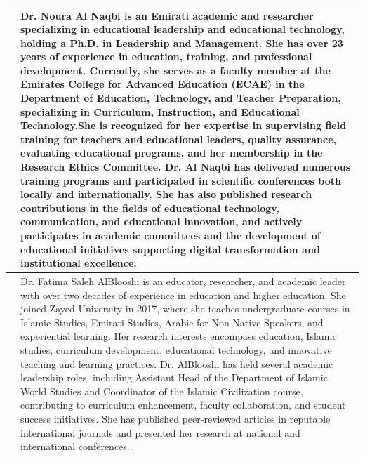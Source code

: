 \documentclass[11pt,a4paper]{article}
\begin{document}
\begin{table}[h]
\begin{tabular}{|l|l|}
{			} & Dr. Noura Al Naqbi is an Emirati academic and researcher specializing in educational leadership and educational technology, holding a Ph.D. in Leadership and Management. She has over 23 years of experience in education, training, and professional development. Currently, she serves as a faculty member at the Emirates College for Advanced Education (ECAE) in the Department of Education, Technology, and Teacher Preparation, specializing in Curriculum, Instruction, and Educational Technology.She is recognized for her expertise in supervising field training for teachers and educational leaders, quality assurance, evaluating educational programs, and her membership in the Research Ethics Committee. Dr. Al Naqbi has delivered numerous training programs and participated in scientific conferences both locally and internationally. She has also published research contributions in the fields of educational technology, communication, and educational innovation, and actively participates in academic committees and the development of educational initiatives supporting digital transformation and institutional excellence. \\ \hline
			\textbf{
				
				\begin{figure}[h]
					\centering
					\fbox{\parbox{0.5\textwidth}{}}
				\end{figure}
				
			} & Dr. Fatima Saleh AlBlooshi is an educator, researcher, and academic leader with over two decades of experience in education and higher education. She joined Zayed University in 2017, where she teaches undergraduate courses in Islamic Studies, Emirati Studies, Arabic for Non-Native Speakers, and experiential learning. Her research interests encompass education, Islamic studies, curriculum development, educational technology, and innovative teaching and learning practices. Dr. AlBlooshi has held several academic leadership roles, including Assistant Head of the Department of Islamic World Studies and Coordinator of the Islamic Civilization course, contributing to curriculum enhancement, faculty collaboration, and student success initiatives. She has published peer-reviewed articles in reputable international journals and presented her research at national and international conferences.. \\ \hline
		\end{tabular}
	\end{table}
	
\end{document}
